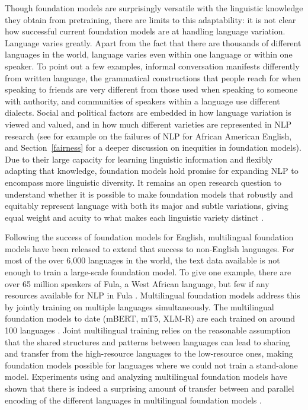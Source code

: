 Though foundation models are surprisingly versatile with the linguistic knowledge they obtain from pretraining, there are limits to this adaptability: it is not clear how successful current foundation models are at handling language variation. Language varies greatly. Apart from the fact that there are thousands of different languages in the world, language varies even within one language or within one speaker. To point out a few examples, informal conversation manifests differently from written language, the grammatical constructions that people reach for when speaking to friends are very different from those used when speaking to someone with authority, and communities of speakers within a language use different dialects. Social and political factors are embedded in how language variation is viewed and valued, and in how much different varieties are represented in NLP research (see for example \citet{blodgett17} on the failures of NLP for African American English, and Section~\ref{fairness} for a deeper discussion on inequities in foundation models). Due to their large capacity for learning linguistic information and flexibly adapting that knowledge, foundation models hold promise for expanding NLP to encompass more linguistic diversity. It remains an open research question to understand whether it is possible to make foundation models that robustly and equitably represent language with both its major and subtle variations, giving equal weight and acuity to what makes each linguistic variety distinct \citep[research posing and addressing this question includes][]{ponti2019modeling, bender2011achieving, joshi2020state}.

Following the success of foundation models for English, multilingual foundation models have been released to extend that success to non-English languages. For most of the over 6,000 languages in the world, the text data available is not enough to train a large-scale foundation model. To give one example, there are over 65 million speakers of Fula, a West African language, but few if any resources available for NLP in Fula \citep{nguer2020sencorpus}. Multilingual foundation models address this by jointly training on multiple languages simultaneously. The multilingual foundation models to date (mBERT, mT5, XLM-R) are each trained on around 100 languages \citep{devlin2019bert, goyal2021larger, xue2020mt5}. Joint multilingual training relies on the reasonable assumption that the shared structures and patterns between languages can lead to sharing and transfer from the high-resource languages to the low-resource ones, making foundation models possible for languages where we could not train a stand-alone model. Experiments using and analyzing multilingual foundation models have shown that there is indeed a surprising amount of transfer between and parallel encoding of the different languages in multilingual foundation models \citep{wu-dredze-2019-beto, choenni2020cross, pires2019multilingual, libovicky2019language, chi2020finding, papadimitriou2021deep, cao2019multilingual}.  

